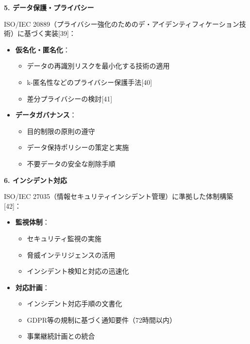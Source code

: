 \documentclass[
  a4paper,
  a4paper,
  11pt]{ltjsbook}
\providecommand{\tightlist}{%
  \setlength{\itemsep}{0pt}\setlength{\parskip}{0pt}}
\begin{document}
\textbf{5. データ保護・プライバシー}

ISO/IEC
20889（プライバシー強化のためのデ・アイデンティフィケーション技術）に基づく実装{[}39{]}：

\begin{itemize}
\tightlist
\item
  \textbf{仮名化・匿名化}：

  \begin{itemize}
  \tightlist
  \item
    データの再識別リスクを最小化する技術の適用
  \item
    k-匿名性などのプライバシー保護手法{[}40{]}
  \item
    差分プライバシーの検討{[}41{]}
  \end{itemize}
\item
  \textbf{データガバナンス}：

  \begin{itemize}
  \tightlist
  \item
    目的制限の原則の遵守
  \item
    データ保持ポリシーの策定と実施
  \item
    不要データの安全な削除手順
  \end{itemize}
\end{itemize}

\textbf{6. インシデント対応}

ISO/IEC
27035（情報セキュリティインシデント管理）に準拠した体制構築{[}42{]}：

\begin{itemize}
\tightlist
\item
  \textbf{監視体制}：

  \begin{itemize}
  \tightlist
  \item
    セキュリティ監視の実施
  \item
    脅威インテリジェンスの活用
  \item
    インシデント検知と対応の迅速化
  \end{itemize}
\item
  \textbf{対応計画}：

  \begin{itemize}
  \tightlist
  \item
    インシデント対応手順の文書化
  \item
    GDPR等の規制に基づく通知要件（72時間以内）
  \item
    事業継続計画との統合
  \end{itemize}
\end{itemize}
\end{document}

